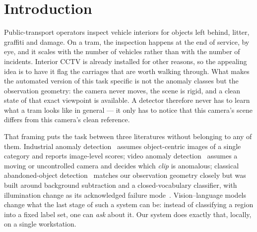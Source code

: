 \section{Introduction}
\label{sec:intro}

Public-transport operators inspect vehicle interiors for objects left behind,
litter, graffiti and damage. On a tram, the inspection happens at the end of
service, by eye, and it scales with the number of vehicles rather than with the
number of incidents. Interior CCTV is already installed for other reasons, so
the appealing idea is to have it flag the carriages that are worth walking
through. What makes the automated version of this task specific is not the
anomaly classes but the observation geometry: the camera never moves, the
scene is rigid, and a clean state of that exact viewpoint is available. A
detector therefore never has to learn what a tram looks like in general --- it
only has to notice that this camera's scene differs from this camera's clean
reference.

That framing puts the task between three literatures without belonging to any
of them. Industrial anomaly detection~\cite{Bergmann_2019,Roth_2022} assumes
object-centric images of a single category and reports image-level scores;
video anomaly detection~\cite{Sultani_2018,Duong_2023} assumes a moving or
uncontrolled camera and decides which \emph{clip} is anomalous; classical
abandoned-object detection~\cite{Luna_2018,Miguel_2008} matches our observation
geometry closely but was built around background subtraction and a
closed-vocabulary classifier, with illumination change as its acknowledged
failure mode~\cite{Park_2020,Park_2019}. Vision--language models change what
the last stage of such a system can be: instead of classifying a region into a
fixed label set, one can \emph{ask} about it. Our system does exactly that,
locally, on a single workstation.

